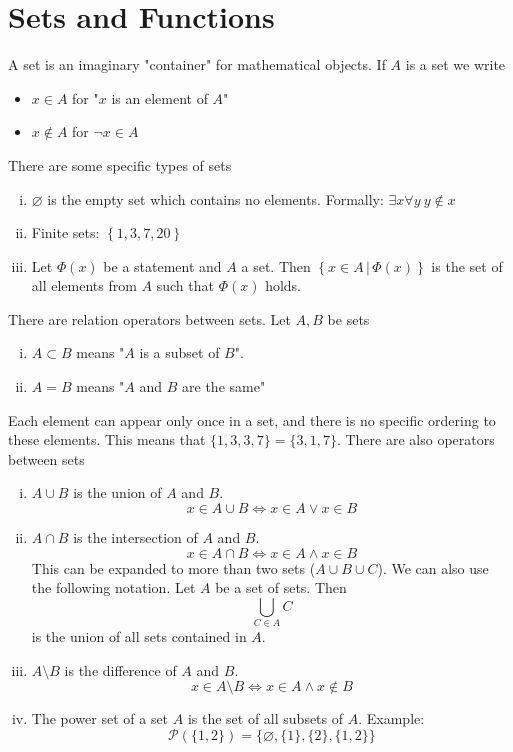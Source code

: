 \documentclass[../../script.tex]{subfiles}
\begin{document}
\section{Sets and Functions}
\begin{defi}
A set is an imaginary "container" for mathematical objects. If $A$ is a set we write
\begin{itemize}
	\item $x \in A$ for "$x$ is an element of $A$"
	\item $x \notin A$ for $\neg x \in A$
\end{itemize}
There are some specific types of sets
\begin{enumerate}[(i)]
	\item $\varnothing$ is the empty set which contains no elements. Formally: $\exists x \forall y ~y\notin x$
	\item Finite sets: $\left\{1, 3, 7, 20\right\}$
	\item Let $\Phi(x)$ be a statement and $A$ a set. Then $\left\{x \in A \,\vert\, \Phi(x)\right\}$ is the set of all elements from $A$ such that $\Phi(x)$ holds.
\end{enumerate}
There are relation operators between sets. Let $A, B$ be sets
\begin{enumerate}[(i)]
	\item $A \subset B$ means "$A$ is a subset of $B$".
	\item $A = B$ means "$A$ and $B$ are the same"
\end{enumerate}
Each element can appear only once in a set, and there is no specific ordering to these elements. This means that $\{1, 3, 3, 7\} = \{3, 1, 7\}$. There are also operators between sets
\begin{enumerate}[(i)]
	\item $A \cup B$ is the union of $A$ and $B$. 
	\[
		x \in A \cup B \iff x \in A \vee x \in B
	\]
	\item $A \cap B$ is the intersection of $A$ and $B$.
	\[
		x \in A \cap B \iff x \in A \wedge x \in B
	\]
	This can be expanded to more than two sets ($A \cup B \cup C$). We can also use the following notation. Let $A$ be a set of sets. Then
	\[
		\bigcup_{C \in A} C
	\]
	is the union of all sets contained in $A$.
	\item $A \setminus B$ is the difference of $A$ and $B$.
	\[
		x \in A \setminus B \iff x \in A \wedge x \notin B
	\]
	\item The power set of a set $A$ is the set of all subsets of $A$. Example:
	\[
		\mathcal{P}(\{1, 2\}) = \{\varnothing, \{1\}, \{2\}, \{1, 2\}\}
	\]
\end{enumerate}
\end{defi}
\end{document}
